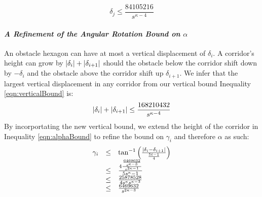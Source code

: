 \begin{equation}\label{eqn:verticalBound}
\delta_j \leq \frac{84105216}{s^{\kappa-4}}
\end{equation}


\paragraph{\textit{A Refinement of the Angular Rotation Bound on $\alpha$}}
An obstacle hexagon can have at most a vertical displacement of $\delta_i$.  
A corridor's height can grow by $\left\vert \delta_i \right\vert + \left\vert \delta_{i+1} \right\vert$ should the obstacle below the corridor shift down by $-\delta_i$ and the obstacle above the corridor shift up $\delta_{i+1}$.  
We infer that the largest vertical displacement in any corridor from our vertical bound Inequality \ref{eqn:verticalBound} is:
$$\left\vert \delta_i \right\vert + \left\vert \delta_{i+1} \right\vert \leq \frac{168210432}{s^{\kappa-4}}$$
By incorportating the new vertical bound, we extend the height of the corridor in Inequality \ref{eqn:alphaBound} to refine the bound on $\gamma_i$ and therefore $\alpha$ as such:
\begin{equation}\label{eqn:alphaBoundRefined}
\begin{array}{rcl}
\gamma_i & \leq & \tan^{-1} \left( \frac{\left\vert \delta_i - \delta_{i+1} \right\vert}
									 {	\frac{5t -1}{4}	}
								 \right)\\
&\leq& \frac{4 \frac{\frac{6469632}{s^{\kappa-3}}}{s^{2\kappa-1}}	}
			  {	5s^\kappa -1}\\
&\leq& \frac{ 25878528 }
			  {	4s^\kappa	s^{\kappa-3}} \\
&\leq& \frac{6469632}{s^{2\kappa-3}}\\
\end{array} 
\end{equation}

